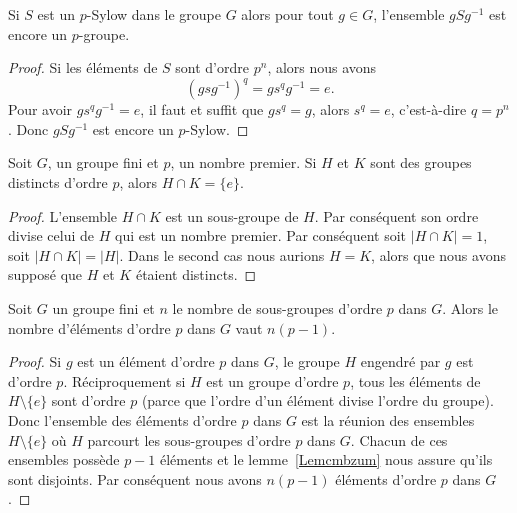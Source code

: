 \begin{proposition}
	Si \( S\) est un \( p\)-Sylow dans le groupe \( G\) alors pour tout \( g\in G\), l'ensemble \( gSg^{-1}\) est encore un \( p\)-groupe.
\end{proposition}

\begin{proof}
	Si les éléments de \( S\) sont d'ordre \( p^n\), alors nous avons
	\begin{equation}
		(gsg^{-1})^q=gs^qg^{-1}=e.
	\end{equation}
	Pour avoir \( gs^qg^{-1}=e\), il faut et suffit que \( gs^q=g\), alors \( s^q=e\), c'est-à-dire \( q=p^n\). Donc \( gSg^{-1}\) est encore un \( p\)-Sylow.
\end{proof}

\begin{lemma}\label{Lemcmbzum}
	Soit \( G\), un groupe fini et \( p\), un nombre premier. Si \( H\) et \( K\) sont des groupes distincts d'ordre \( p\), alors \( H\cap K=\{ e \}\).
\end{lemma}

\begin{proof}
	L'ensemble \( H\cap K\) est un sous-groupe de \( H\). Par conséquent son ordre divise celui de \( H\) qui est un nombre premier. Par conséquent soit \( | H\cap K |=1\), soit \( | H\cap K |=| H |\). Dans le second cas nous aurions \( H=K\), alors que nous avons supposé que \( H\) et \( K\) étaient distincts.
\end{proof}

\begin{proposition} \label{PropyfhTmf}
	Soit \( G\) un groupe fini et \( n\) le nombre de sous-groupes d'ordre \( p\) dans \( G\). Alors le nombre d'éléments d'ordre \( p\) dans \( G\) vaut \( n(p-1)\).
\end{proposition}

\begin{proof}
	Si \( g\) est un élément d'ordre \( p\) dans \( G\), le groupe \( H\) engendré par \( g\) est d'ordre \( p\). Réciproquement si \( H\) est un groupe d'ordre \( p\), tous les éléments de \( H\setminus\{ e \}\) sont d'ordre \( p\) (parce que l'ordre d'un élément divise l'ordre du groupe). Donc l'ensemble des éléments d'ordre \( p\) dans \( G\) est la réunion des ensembles \( H\setminus\{ e \}\) où \( H\) parcourt les sous-groupes d'ordre \( p\) dans \( G\). Chacun de ces ensembles possède \( p-1\) éléments et le lemme~\ref{Lemcmbzum} nous assure qu'ils sont disjoints. Par conséquent nous avons \( n(p-1)\) éléments d'ordre \( p\) dans \( G\).
\end{proof}

